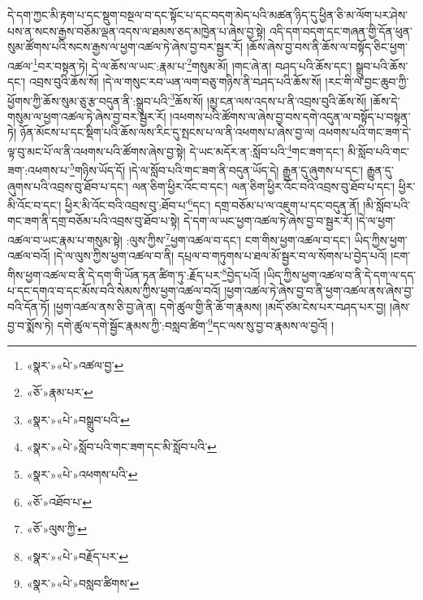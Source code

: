 དེ་དག་ཀྱང་མི་རྟག་པ་དང་སྡུག་བསྔལ་བ་དང་སྟོང་པ་དང་བདག་མེད་པའི་མཚན་ཉིད་དུ་ཕྱིན་ཅི་མ་ལོག་པར་ཤེས་པས་ན་སངས་རྒྱས་བཅོམ་ལྡན་འདས་ལ་ཐམས་ཅད་མཁྱེན་པ་ཞེས་བྱ་སྟེ། འདི་དག་བདག་དང་གཞན་གྱི་དོན་ཕུན་སུམ་ཚོགས་པའི་སངས་རྒྱས་ལ་ཕྱག་འཚལ་ཏེ་ཞེས་བྱ་བར་སྦྱར་རོ། །ཆོས་ཞེས་བྱ་བས་ནི་ཆོས་ལ་བསྟོད་ཅིང་ཕྱག་འཚལ་\footnote{«སྣར་»«པེ་»འཚལ་བྱ་}བར་བསྟན་ཏེ། དེ་ལ་ཆོས་ལ་ཡང་:རྣམ་པ་\footnote{«ཅོ་»རྣམ་པར་}གསུམ་མོ། །གང་ཞེ་ན། བཤད་པའི་ཆོས་དང་། སྒྲུབ་པའི་ཆོས་དང་། འབྲས་བུའི་ཆོས་སོ། །དེ་ལ་གསུང་རབ་ཡན་ལག་བཅུ་གཉིས་ནི་བཤད་པའི་ཆོས་སོ། །རང་གི་ལ་བྱང་ཆུབ་ཀྱི་ཕྱོགས་ཀྱི་ཆོས་སུམ་ཅུ་རྩ་བདུན་ནི་:སྒྲུབ་པའི་\footnote{«སྣར་»«པེ་»བསྒྲུབ་པའི་}ཆོས་སོ། །མྱ་ངན་ལས་འདས་པ་ནི་འབྲས་བུའི་ཆོས་སོ། །ཆོས་དེ་གསུམ་ལ་ཕྱག་འཚལ་ཏེ་ཞེས་བྱ་བར་སྦྱར་རོ། །འཕགས་པའི་ཚོགས་ལ་ཞེས་བྱ་བས་དགེ་འདུན་ལ་བསྟོད་པ་བསྟན་ཏེ། ཉོན་མོངས་པ་དང་སྡིག་པའི་ཆོས་ལས་རིང་དུ་སྤངས་པ་ལ་ནི་འཕགས་པ་ཞེས་བྱ་ལ། འཕགས་པའི་གང་ཟག་དེ་ལྟ་བུ་མང་པོ་ལ་ནི་འཕགས་པའི་ཚོགས་ཞེས་བྱ་སྟེ། དེ་ཡང་མདོར་ན་:སློབ་པའི་\footnote{«སྣར་»«པེ་»སློབ་པའི་གང་ཟག་དང་མི་སློབ་པའི་}གང་ཟག་དང་། མི་སློབ་པའི་གང་ཟག་:འཕགས་པ་\footnote{«སྣར་»«པེ་»འཕགས་པའི་}གཉིས་ཡོད་དོ། །དེ་ལ་སློབ་པའི་གང་ཟག་ནི་བདུན་ཡོད་དེ། རྒྱུན་དུ་ཞུགས་པ་དང་། རྒྱུན་དུ་ཞུགས་པའི་འབྲས་བུ་ཐོབ་པ་དང་། ལན་ཅིག་ཕྱིར་འོང་བ་དང་། ལན་ཅིག་ཕྱིར་འོང་བའི་འབྲས་བུ་ཐོབ་པ་དང་། ཕྱིར་མི་འོང་བ་དང་། ཕྱིར་མི་འོང་བའི་འབྲས་བུ་:ཐོབ་པ་\footnote{«ཅོ་»འཐོབ་པ་}དང་། དགྲ་བཅོམ་པ་ལ་འཇུག་པ་དང་བདུན་ནོ། །མི་སློབ་པའི་གང་ཟག་ནི་དགྲ་བཅོམ་པའི་འབྲས་བུ་ཐོབ་པ་སྟེ། དེ་དག་ལ་ཡང་ཕྱག་འཚལ་ཏེ་ཞེས་བྱ་བ་སྦྱར་རོ། །དེ་ལ་ཕྱག་འཚལ་བ་ཡང་རྣམ་པ་གསུམ་སྟེ། :ལུས་ཀྱིས་\footnote{«ཅོ་»ལུས་ཀྱི་}ཕྱག་འཚལ་བ་དང་། ངག་གིས་ཕྱག་འཚལ་བ་དང་། ཡིད་ཀྱིས་ཕྱག་འཚལ་བའོ། །དེ་ལ་ལུས་ཀྱིས་ཕྱག་འཚལ་བ་ནི། དཔྲལ་བ་གཏུགས་པ་ཐལ་མོ་སྦྱར་བ་ལ་སོགས་པ་བྱེད་པའོ། །ངག་གིས་ཕྱག་འཚལ་བ་ནི་དེ་དག་གི་ཡོན་ཏན་ཚིག་ཏུ་:རྗོད་པར་\footnote{«སྣར་»«པེ་»བརྗོད་པར་}བྱེད་པའོ། །ཡིད་ཀྱིས་ཕྱག་འཚལ་བ་ནི་དེ་དག་ལ་དད་པ་དང་དགའ་བ་དང་མོས་བའི་སེམས་ཀྱིས་ཕྱག་འཚལ་བའོ། །ཕྱག་འཚལ་ཏེ་ཞེས་བྱ་བ་ནི་ཕྱག་འཚལ་ནས་ཞེས་བྱ་བའི་དོན་ཏོ། །ཕྱག་འཚལ་ནས་ཅི་བྱ་ཞེ་ན། དགེ་ཚུལ་གྱི་ནི་ཆོ་ག་རྣམས། །མདོ་ཙམ་ངེས་པར་བཤད་པར་བྱ། །ཞེས་བྱ་བ་སྨོས་ཏེ། དགེ་ཚུལ་དགེ་སྦྱོང་རྣམས་ཀྱི་:བསླབ་ཚིག་\footnote{«སྣར་»«པེ་»བསླབ་ཚིགས་}དང་ལས་སུ་བྱ་བ་རྣམས་ལ་བྱའོ། །
